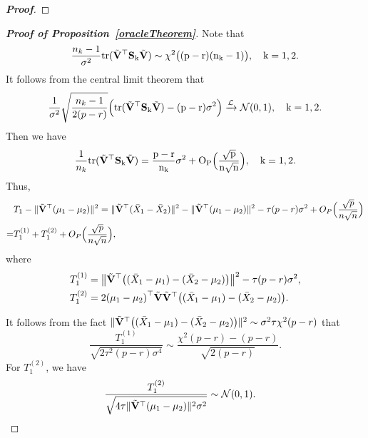 \documentclass[times,sort&compress,3p]{elsarticle}
\newcommand{\mytr}{\rm tr}
\theoremstyle{plain}
\theoremstyle{definition}
\theoremstyle{remark}
\begin{document}
\begin{appendices}
\begin{proof}[\textbf{Proof}]
\end{proof}


\begin{proof}[\textbf{Proof of Proposition~\ref{oracleTheorem}}]
    Note that
    $$
    \frac{n_k-1}{\sigma^2} \mytr(\tilde{\BV}^\top  \BS_k \tilde{\BV})\sim \chi^2\big((p-r)(n_k-1)\big),\quad k=1,2.
    $$
    It follows from the central limit theorem that
    \begin{equation*}
        \begin{aligned}
            \frac{1}{\sigma^2}\sqrt{\frac{n_k-1}{2(p-r)}}\Big( \mytr(\tilde{\BV}^\top  \BS_k \tilde{\BV})-(p-r)\sigma^2\Big)\xrightarrow{\mathcal{L}}\mathcal{N}(0,1),\quad k=1,2.
        \end{aligned}
    \end{equation*}
    Then we have
    $$
           \frac{1}{n_k} \mytr(\tilde{\BV}^\top  \BS_k \tilde{\BV}) =
            \frac{p-r}{n_k}\sigma^2 + O_P\Big(\frac{\sqrt{p}}{n\sqrt{n}}\Big),\quad k=1,2.
    $$
    Thus,
    \begin{equation*}
        \begin{aligned}
            &T_1-\|\tilde{\mathbf{V}}^\top (\mu_1-\mu_2)\|^2=
            \|\tilde{\mathbf{V}}^\top (\bar{X}_1-\bar{X}_2)\|^2-
            \|\tilde{\mathbf{V}}^\top (\mu_1-\mu_2)\|^2
            -  \tau (p-r)\sigma^2 + O_P\Big(\frac{\sqrt{p}}{n\sqrt{n}}\Big)\\
            =&
            T_1^{(1)}+T_1^{(2)}
            + O_P\Big(\frac{\sqrt{p}}{n\sqrt{n}}\Big)
            ,
        \end{aligned}
    \end{equation*}
    where
    \begin{align*}
        T_1^{(1)}&=\big\|\tilde{\mathbf{V}}^\top \big((\bar{X}_1-\mu_1)-(\bar{X}_2-\mu_2)\big)\big\|^2   -  \tau (p-r)\sigma^2, \\
        T_1^{(2)}&=2{(\mu_1-\mu_2)}^\top \tilde{\mathbf{V}}\tilde{\mathbf{V}}^\top \big((\bar{X}_1-\mu_1)-(\bar{X}_2-\mu_2)\big).
    \end{align*}

It follows from the fact
$\|\tilde{\mathbf{V}}^\top  \big( (\bar{X}_1-\mu_1)-(\bar{X}_2-\mu_2) \big)\|^2\sim \sigma^2\tau\chi^2(p-r)$ that
$$
            \frac{T_1^{(1)}}{\sqrt{2\tau^2 (p-r)\sigma^4}}\sim \frac{\chi^2 (p-r)- (p-r)}{\sqrt{2(p-r)}}.
    $$
    For $T_1^{(2)}$, we have
    \begin{equation*}
        \begin{aligned}
            &\frac{T_1^{(2)}}{\sqrt{4\tau\|\tilde{\mathbf{V}}^\top (\mu_1-\mu_2)\|^2\sigma^2}}
            \sim \mathcal{N}(0,1).
        \end{aligned}
    \end{equation*}


\end{proof}
\end{appendices}
\end{document}
